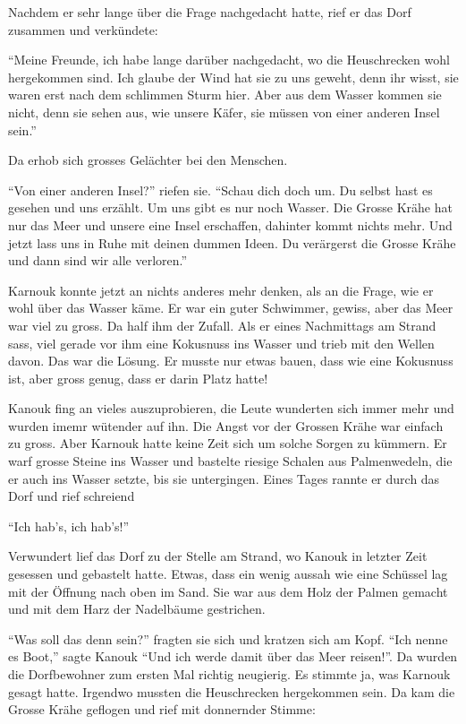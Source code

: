Nachdem er sehr lange über die Frage nachgedacht hatte, rief er das Dorf zusammen und verkündete:

\enquote{Meine Freunde, ich habe lange darüber nachgedacht, wo die Heuschrecken wohl hergekommen sind. Ich glaube der Wind hat sie zu uns geweht, denn ihr wisst, sie waren erst nach dem schlimmen Sturm hier. Aber aus dem Wasser kommen sie nicht, denn sie sehen aus, wie unsere Käfer, sie müssen von einer anderen Insel sein.}

Da erhob sich grosses Gelächter bei den Menschen.

\enquote{Von einer anderen Insel?} riefen sie. \enquote{Schau dich doch um. Du selbst hast es gesehen und uns erzählt. Um uns gibt es nur noch Wasser. Die Grosse Krähe hat nur das Meer und unsere eine Insel erschaffen, dahinter kommt nichts mehr. Und jetzt lass uns in Ruhe mit deinen dummen Ideen. Du verärgerst die Grosse Krähe und dann sind wir alle verloren.}











Karnouk konnte jetzt an nichts anderes mehr denken, als an die Frage, wie er wohl über das Wasser käme. Er war ein guter Schwimmer, gewiss, aber das Meer war viel zu gross. Da half ihm der Zufall. Als er eines Nachmittags am Strand sass, viel gerade vor ihm eine Kokusnuss ins Wasser und trieb mit den Wellen davon. Das war die Lösung. Er musste nur etwas bauen, dass wie eine Kokusnuss ist, aber gross genug, dass er darin Platz hatte!

Kanouk fing an vieles auszuprobieren, die Leute wunderten sich immer mehr und wurden imemr wütender auf ihn. Die Angst vor der Grossen Krähe war einfach zu gross. Aber Karnouk hatte keine Zeit sich um solche Sorgen zu kümmern. Er warf grosse Steine ins Wasser und bastelte riesige Schalen aus Palmenwedeln, die er auch ins Wasser setzte, bis sie untergingen. Eines Tages rannte er durch das Dorf und rief schreiend 

\enquote{Ich hab's, ich hab's!}

Verwundert lief das Dorf zu der Stelle am Strand, wo Kanouk in letzter Zeit gesessen und gebastelt hatte. Etwas, dass ein wenig aussah wie eine Schüssel lag mit der Öffnung nach oben im Sand. Sie war aus dem Holz der Palmen gemacht und mit dem Harz der Nadelbäume gestrichen. 

\enquote{Was soll das denn sein?} fragten sie sich und kratzen sich am Kopf. \enquote{Ich nenne es Boot,} sagte Kanouk \enquote{Und ich werde damit über das Meer reisen!}. Da wurden die Dorfbewohner zum ersten Mal richtig neugierig. Es stimmte ja, was Karnouk gesagt hatte. Irgendwo mussten die Heuschrecken hergekommen sein. Da kam die Grosse Krähe geflogen und rief mit donnernder Stimme:

